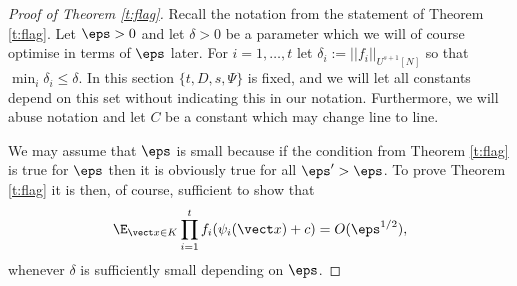 \begin{proof}[Proof of Theorem \ref{t:flag}]
Recall the notation from the statement of Theorem \ref{t:flag}. Let $\eps >0$ and let $\delta>0$ be a parameter which we will of course optimise in terms of $\eps$ later. For $i=1, \ldots, t$ let  $\delta_i :=||f_i||_{U^{s+1}[N]}$  so that $\min_i\delta_i\leq  \delta$.  In this section  $\{t,D,s,\Psi\}$ is fixed, and  we will let all constants depend on this set without indicating this in our notation. Furthermore, we will abuse notation and let $C$ be a constant which may change line to line.

We may assume that $\eps$ is small because if the condition from Theorem \ref{t:flag} is true for $\eps$ then it is obviously true for all $\eps'>\eps$. To prove Theorem \ref{t:flag} it is then, of course, sufficient to show that 
\[\E_{\vect x \in K} \prod_{i=1}^t f_i(\psi_i(\vect x)+c) = O(\eps^{1/2}) ,\]
whenever $\delta$ is sufficiently small depending on $\eps$. 


\end{proof}

